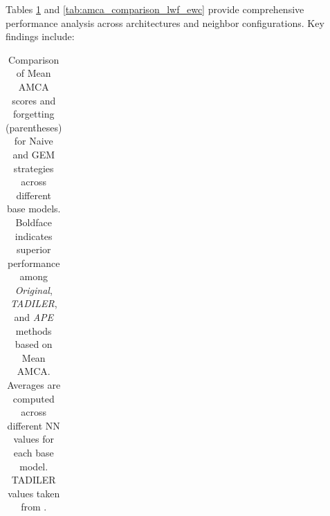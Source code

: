 \documentclass[pdflatex,sn-mathphys-num]{sn-jnl}%
\theoremstyle{thmstyleone}%
\theoremstyle{thmstyletwo}%
\theoremstyle{thmstylethree}%
\begin{document}
Tables \ref{tab:amca_comparison_naive_gem} and \ref{tab:amca_comparison_lwf_ewc} provide comprehensive performance analysis across architectures and neighbor configurations. Key findings include:


\begin{table}
\centering
\tiny
  {\caption{Comparison of Mean AMCA scores and forgetting (parentheses) for Naive and GEM strategies across different base models. Boldface
indicates superior performance among \textit{Original}, \textit{TADILER}, and \textit{APE} methods based on Mean AMCA. Averages are
computed across different NN values for each base model. TADILER values taken from \cite{BravoRocca2025}.}
  \label{tab:amca_comparison_naive_gem}
}
  {\begin{tabular}{llcccccc}
  

\end{tabular}}
\end{table}
\end{document}

